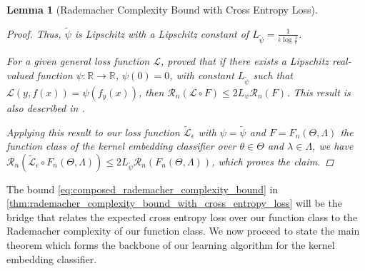 \documentclass{article}
\newtheorem{lemma}[theorem]{Lemma}
\begin{document}
\begin{lemma}[Rademacher Complexity Bound with Cross Entropy Loss]
\begin{proof}
				Thus, $\tilde{\psi}$ is Lipschitz with a Lipschitz constant of $L_{\tilde{\psi}} = \frac{1}{\epsilon \log{\frac{1}{\epsilon}}}$.
				
				For a given general loss function $\mathcal{L}$, \citet[Corollary 3.17]{ledoux2013probability} proved that if there exists a Lipschitz real-valued function $\psi : \mathbb{R} \to \mathbb{R}$, $\psi(0) = 0$, with constant $L_{\tilde{\psi}}$ such that $\mathcal{L}(y, f(x)) = \psi(f_{y}(x))$, then $\mathcal{R}_{n}(\mathcal{L} \circ F) \leq 2 L_{\psi} \mathcal{R}_{n}(F)$. This result is also described in \citet[Theorem 12.4]{bartlett2002rademacher}.
				
				Applying this result to our loss function $\tilde{\mathcal{L}}_{\epsilon}$ with $\psi = \tilde{\psi}$ and $F = F_{n}(\Theta, \Lambda)$ the function class of the kernel embedding classifier over $\theta \in \Theta$ and $\lambda \in \Lambda$, we have $\mathcal{R}_{n}(\tilde{\mathcal{L}}_{\epsilon} \circ F_{n}(\Theta, \Lambda)) \leq 2 L_{\tilde{\psi}} \mathcal{R}_{n}(F_{n}(\Theta, \Lambda))$, which proves the claim.
			\end{proof}
		\end{lemma}
		
		The bound \eqref{eq:composed_rademacher_complexity_bound} in \cref{thm:rademacher_complexity_bound_with_cross_entropy_loss} will be the bridge that relates the expected cross entropy loss over our function class to the Rademacher complexity of our function class. We now proceed to state the main theorem which forms the backbone of our learning algorithm for the kernel embedding classifier.
		
\end{document}
